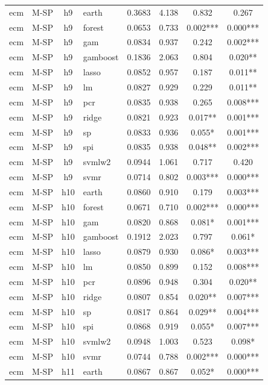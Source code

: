 \begin{ThreePartTable}
\begin{longtable}[t]{llclcccc}
\addlinespace
ecm & M-SP & h9 & earth & 0.3683 & 4.138 & 0.832 & 0.267\\
ecm & M-SP & h9 & forest & 0.0653 & 0.733 & 0.002*** & 0.000***\\
ecm & M-SP & h9 & gam & 0.0834 & 0.937 & 0.242 & 0.002***\\
ecm & M-SP & h9 & gamboost & 0.1836 & 2.063 & 0.804 & 0.020**\\
ecm & M-SP & h9 & lasso & 0.0852 & 0.957 & 0.187 & 0.011**\\
ecm & M-SP & h9 & lm & 0.0827 & 0.929 & 0.229 & 0.011**\\
ecm & M-SP & h9 & pcr & 0.0835 & 0.938 & 0.265 & 0.008***\\
ecm & M-SP & h9 & ridge & 0.0821 & 0.923 & 0.017** & 0.001***\\
ecm & M-SP & h9 & sp & 0.0833 & 0.936 & 0.055* & 0.001***\\
ecm & M-SP & h9 & spi & 0.0835 & 0.938 & 0.048** & 0.002***\\
ecm & M-SP & h9 & svmlw2 & 0.0944 & 1.061 & 0.717 & 0.420\\
ecm & M-SP & h9 & svmr & 0.0714 & 0.802 & 0.003*** & 0.000***\\
\addlinespace
ecm & M-SP & h10 & earth & 0.0860 & 0.910 & 0.179 & 0.003***\\
ecm & M-SP & h10 & forest & 0.0671 & 0.710 & 0.002*** & 0.000***\\
ecm & M-SP & h10 & gam & 0.0820 & 0.868 & 0.081* & 0.001***\\
ecm & M-SP & h10 & gamboost & 0.1912 & 2.023 & 0.797 & 0.061*\\
ecm & M-SP & h10 & lasso & 0.0879 & 0.930 & 0.086* & 0.003***\\
ecm & M-SP & h10 & lm & 0.0850 & 0.899 & 0.152 & 0.008***\\
ecm & M-SP & h10 & pcr & 0.0896 & 0.948 & 0.304 & 0.020**\\
ecm & M-SP & h10 & ridge & 0.0807 & 0.854 & 0.020** & 0.007***\\
ecm & M-SP & h10 & sp & 0.0817 & 0.864 & 0.029** & 0.004***\\
ecm & M-SP & h10 & spi & 0.0868 & 0.919 & 0.055* & 0.007***\\
ecm & M-SP & h10 & svmlw2 & 0.0948 & 1.003 & 0.523 & 0.098*\\
ecm & M-SP & h10 & svmr & 0.0744 & 0.788 & 0.002*** & 0.000***\\
\addlinespace
ecm & M-SP & h11 & earth & 0.0867 & 0.867 & 0.052* & 0.000***\\

\end{longtable}
\end{ThreePartTable}
